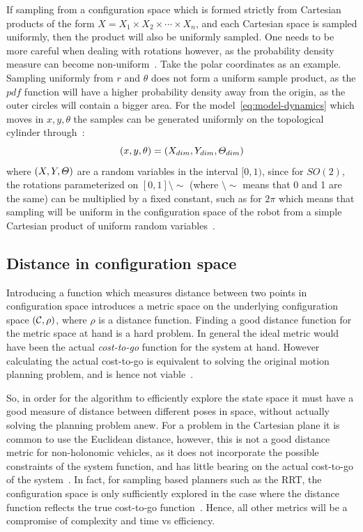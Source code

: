 If sampling from a configuration space which is formed strictly from Cartesian
products of the form \(X = X_1\times X_2\times \cdots \times X_n\), and each
Cartesian space is sampled uniformly, then the product will also be uniformly
sampled. One needs to be more careful when dealing with rotations however, as
the probability density measure can become non-uniform~\cite{Lav06}. Take the
polar coordinates as an example. Sampling uniformly from \(r\) and \(\theta\)
does not form a uniform sample product, as the \(pdf\) function will have a
higher probability density away from the origin, as the outer circles will
contain a bigger area. For the model~\cref{eq:model-dynamics} which moves in
\(x,y,\theta\) the samples can be generated uniformly on the topological
cylinder through~\cite{kuffnerEffectiveSamplingDistance2004}:
\[
  (x,y,\theta) = (\mathnormal{X}_{dim}, \mathnormal{Y}_{dim},
  \mathnormal{\Theta}_{dim})
\]
where \((\mathnormal{X}, \mathnormal{Y}, \mathnormal{\Theta})\) are a random
variables in the interval \([0,1)\), since for \(SO(2)\), the rotations
parameterized on \([0,1]\setminus\sim\) (where \(\setminus\sim\) means that 0
and 1 are the same) can be multiplied by a fixed constant, such as for \(2\pi\)
which means that sampling will be uniform in the configuration space of the
robot from a simple Cartesian product of uniform random variables~\cite{Lav06}.

\subsection{Distance in configuration space}

Introducing a function which measures distance between two points in
configuration space introduces a metric space on the underlying configuration
space \((\mathcal{C}{},\rho)\), where \(\rho\) is a distance
function. Finding a good distance function for the metric space at hand is a
hard problem. In general the ideal metric would have been the actual
\textit{cost-to-go} function for the system at hand. However calculating the
actual cost-to-go is equivalent to solving the original motion planning problem,
and is hence not viable~\cite{pengchengReducingMetricSensitivity2001}.

So, in order for the \rrtfunnel{} algorithm to efficiently explore the state
space it must have a good measure of distance between different poses in space,
without actually solving the planning problem anew. For a problem in the
Cartesian plane it is common to use the Euclidean distance, however, this is not
a good distance metric for non-holonomic vehicles, as it does not incorporate
the possible constraints of the system function, and has little bearing on the
actual cost-to-go of the system~\cite{parkFeedbackMotionPlanning2015}. In fact,
for sampling based planners such as the \ac{RRT}, the configuration space is
only sufficiently explored in the case where the distance function reflects the
true cost-to-go function~\cite{pengchengReducingMetricSensitivity2001}. Hence,
all other metrics will be a compromise of complexity and time vs efficiency.

